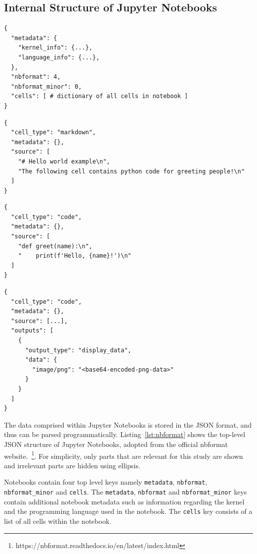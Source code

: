\documentclass[conference]{IEEEtran}
\begin{document}
\subsection{Internal Structure of Jupyter Notebooks}\label{sec:nbformat}

\begin{lstlisting}[caption={Top-level JSON format of Jupyter notebooks. See Listing~\ref{lst:cell-md},~\ref{lst:cell-code} and~\ref{lst:cell-output} for internal structure of various cells.}, label={lst:nbformat}]
{
  "metadata": {
    "kernel_info": {...},
    "language_info": {...},
  },
  "nbformat": 4,
  "nbformat_minor": 0,
  "cells": [ # dictionary of all cells in notebook ]
}
\end{lstlisting}
\begin{lstlisting}[caption={JSON structure of markdown cells.}, label={lst:cell-md}]
{
  "cell_type": "markdown",
  "metadata": {},
  "source": [
    "# Hello world example\n",
    "The following cell contains python code for greeting people!\n"
  ]
}
\end{lstlisting}

\begin{lstlisting}[caption={JSON structure of code cells.}, label={lst:cell-code}]
{
  "cell_type": "code",
  "metadata": {},
  "source": [
    "def greet(name):\n",
    "    print(f'Hello, {name}!')\n"
  ]
}
\end{lstlisting}

\begin{lstlisting}[caption={JSON structure of code cells with an image output.}, label={lst:cell-output}]
{
  "cell_type": "code",
  "metadata": {},
  "source": [...],
  "outputs": [
    {
      "output_type": "display_data",
      "data": {
        "image/png": "<base64-encoded-png-data>"
      }
    }
  ]
}
\end{lstlisting}

The data comprised within Jupyter Notebooks is stored in the JSON format, and thus can be parsed programmatically. Listing~\ref{lst:nbformat} shows the top-level JSON structure of Jupyter Notebooks, adopted from the official nbformat website.~\footnote{https://nbformat.readthedocs.io/en/latest/index.html}. For simplicity, only parts that are relevant for this study are shown and irrelevant parts are hidden using ellipsis.

Notebooks contain four top level keys namely \texttt{metadata}, \texttt{nbformat}, \texttt{nbformat\_minor} and \texttt{cells}. The \texttt{metadata}, \texttt{nbformat} and \texttt{nbformat\_minor} keys contain additional notebook metadata such as information regarding the kernel and the programming language used in the notebook. The \texttt{cells} key consists of a list of all cells within the notebook.
\end{document}
